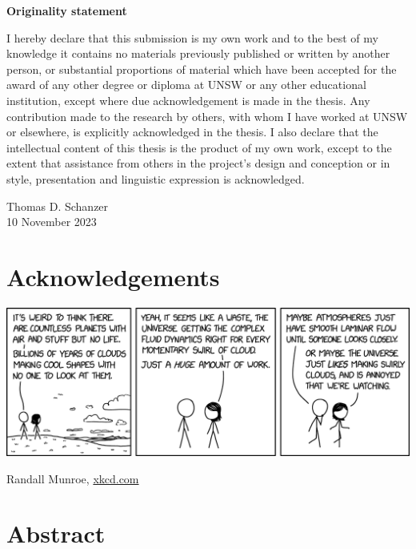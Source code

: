 \documentclass[../main.tex]{subfiles}
\begin{document}
\vspace*{\fill}
\begin{center}
{\textbf{Originality statement}}

\begin{minipage}{0.7\linewidth}
    I hereby declare that this submission is my own work and to the best of
    my knowledge it contains no materials previously published or written by
    another person, or substantial proportions of material which have been
    accepted for the award of any other degree or diploma at UNSW or any
    other educational institution, except where due acknowledgement is made
    in the thesis. Any contribution made to the research by others, with
    whom I have worked at UNSW or elsewhere, is explicitly acknowledged in
    the thesis. I also declare that the intellectual content of this thesis
    is the product of my own work, except to the extent that assistance from
    others in the project's design and conception or in style, presentation
    and linguistic expression is acknowledged.

    \begin{flushright}
        Thomas D. Schanzer \\ 10 November 2023
    \end{flushright}
\end{minipage}
\end{center}
\vspace{3cm}
\vfill

\makeatletter\@openrightfalse\makeatother
\chapter*{Acknowledgements}

\clearpage
\vspace*{\fill}
\begin{center}
    \includegraphics[width=\linewidth]{figures/cloud_swirls.png}

    {
        \footnotesize \color{gray}
        Randall Munroe, \href{https://xkcd.com/2664/}{xkcd.com}
    }
\end{center}
\vfill

\chapter*{Abstract}

\tableofcontents

\makeatletter\@openrighttrue\makeatother
\mainmatter
\end{document}
